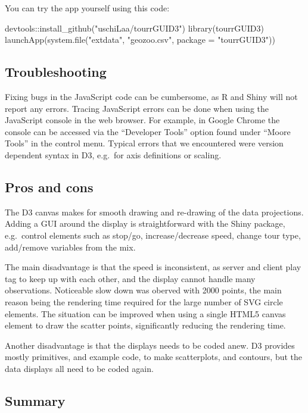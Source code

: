 You can try the app yourself using this code:

\begin{Schunk}
\begin{Sinput}
devtools::install_github("uschiLaa/tourrGUID3")
library(tourrGUID3)
launchApp(system.file("extdata", "geozoo.csv", package = "tourrGUID3"))
\end{Sinput}
\end{Schunk}

\hypertarget{troubleshooting}{%
\subsection{Troubleshooting}\label{troubleshooting}}

Fixing bugs in the JavaScript code can be cumbersome, as R and Shiny
will not report any errors. Tracing JavaScript errors can be done when
using the JavaScript console in the web browser. For example, in Google
Chrome the console can be accessed via the ``Developer Tools'' option
found under ``Moore Tools'' in the control menu. Typical errors that we
encountered were version dependent syntax in D3, e.g.~for axis
definitions or scaling.

\hypertarget{pros-and-cons}{%
\subsection{Pros and cons}\label{pros-and-cons}}

The D3 canvas makes for smooth drawing and re-drawing of the data
projections. Adding a GUI around the display is straightforward with the
Shiny package, e.g.~control elements such as stop/go, increase/decrease
speed, change tour type, add/remove variables from the mix.

The main disadvantage is that the speed is inconsistent, as server and
client play tag to keep up with each other, and the display cannot
handle many observations. Noticeable slow down was oberved with 2000
points, the main reason being the rendering time required for the large
number of SVG circle elements. The situation can be improved when using
a single HTML5 canvas element to draw the scatter points, significantly
reducing the rendering time.

Another disadvantage is that the displays needs to be coded anew. D3
provides mostly primitives, and example code, to make scatterplots, and
contours, but the data displays all need to be coded again.

\hypertarget{summary}{%
\subsection{Summary}\label{summary}}

